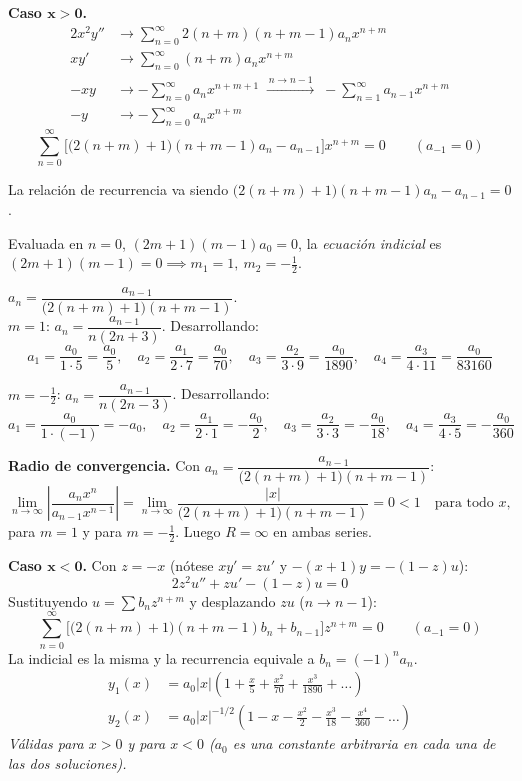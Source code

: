 \documentclass[11pt, a4paper]{article}
\begin{document}
\vspace{0.2cm}\noindent\textbf{Caso $\bm{x>0}$.}
\begin{align*}
2x^2y'' &\to \sum_{n=0}^\infty 2(n+m)(n+m-1)a_nx^{n+m} \\
xy' &\to \sum_{n=0}^\infty (n+m)a_nx^{n+m} \\
-xy &\to -\sum_{n=0}^\infty a_nx^{n+m+1} \;\xrightarrow{\,n\to n-1\,}\; -\sum_{n=1}^\infty a_{n-1}x^{n+m} \\
-y &\to -\sum_{n=0}^\infty a_nx^{n+m}
\end{align*}
\[
\sum_{n=0}^\infty\Big[\big(2(n+m)+1\big)(n+m-1)a_n-a_{n-1}\Big]x^{n+m}=0 \qquad (a_{-1}=0)
\]

\smallskip\noindent La relación de recurrencia va siendo $\big(2(n+m)+1\big)(n+m-1)a_n-a_{n-1}=0$.

\smallskip\noindent Evaluada en $n=0$, $(2m+1)(m-1)a_0=0$, la \emph{ecuación indicial} es $(2m+1)(m-1)=0 \implies m_1=1,\ m_2=-\tfrac12$.

 $a_n=\dfrac{a_{n-1}}{\big(2(n+m)+1\big)(n+m-1)}$.\\

\smallskip\noindent $m=1$: $a_n=\dfrac{a_{n-1}}{n(2n+3)}$. Desarrollando:
\[
a_1=\frac{a_0}{1\cdot5}=\frac{a_0}5,\quad a_2=\frac{a_1}{2\cdot7}=\frac{a_0}{70},\quad a_3=\frac{a_2}{3\cdot9}=\frac{a_0}{1890},\quad a_4=\frac{a_3}{4\cdot11}=\frac{a_0}{83160}
\]

\smallskip\noindent $m=-\tfrac12$: $a_n=\dfrac{a_{n-1}}{n(2n-3)}$. Desarrollando:
\[
a_1=\frac{a_0}{1\cdot(-1)}=-a_0,\quad a_2=\frac{a_1}{2\cdot1}=-\frac{a_0}2,\quad a_3=\frac{a_2}{3\cdot3}=-\frac{a_0}{18},\quad a_4=\frac{a_3}{4\cdot5}=-\frac{a_0}{360}
\]

\smallskip\noindent\textbf{Radio de convergencia.} Con $a_n=\dfrac{a_{n-1}}{\big(2(n+m)+1\big)(n+m-1)}$:
\[
\lim_{n\to\infty}\left|\frac{a_{n}x^{n}}{a_{n-1}x^{n-1}}\right|=\lim_{n\to\infty}\frac{|x|}{\big(2(n+m)+1\big)(n+m-1)}=0<1 \quad\text{para todo }x,
\]
para $m=1$ y para $m=-\tfrac12$. Luego $R=\infty$ en ambas series.

\vspace{0.2cm}\noindent\textbf{Caso $\bm{x<0}$.} Con $z=-x$ (nótese $xy'=zu'$ y $-(x+1)y=-(1-z)u$):
\[
2z^2u''+zu'-(1-z)u=0
\]
Sustituyendo $u=\sum b_nz^{n+m}$ y desplazando $zu$ ($n\to n-1$):
\[
\sum_{n=0}^\infty\Big[\big(2(n+m)+1\big)(n+m-1)b_n+b_{n-1}\Big]z^{n+m}=0 \qquad (a_{-1}=0)
\]
La indicial es la misma y la recurrencia equivale a $b_n=(-1)^na_n$.
\[
\boxed{\begin{aligned}
y_1(x)&=a_0|x|\left(1+\frac{x}{5}+\frac{x^2}{70}+\frac{x^3}{1890}+\dots\right) \\[2pt]
y_2(x)&=a_0|x|^{-1/2}\left(1-x-\frac{x^2}{2}-\frac{x^3}{18}-\frac{x^4}{360}-\dots\right)
\end{aligned}}
\]
\textit{Válidas para $x>0$ y para $x<0$ ($a_0$ es una constante arbitraria en cada una de las dos soluciones).}
\end{document}
